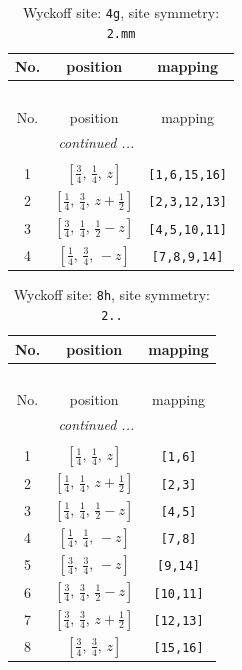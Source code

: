 \documentclass[fleqn,8pt]{jsarticle}
\begin{document}
\renewcommand{\arraystretch}{1.2}
\begin{longtable}{ccc}
\caption{Wyckoff site: {\tt 4g}, site symmetry: {\tt 2.mm}}
 \\
 \hline \hline
No. & position & mapping \\ \hline \endfirsthead

\multicolumn{2}{l}{\tablename\ \thetable{}} \\
 \hline \hline
No. & position & mapping \\ \hline \endhead

 \hline \hline
\multicolumn{2}{r}{\footnotesize\it continued ...} \\ \endfoot

 \hline \hline
\multicolumn{2}{r}{} \\ \endlastfoot

1 & $\left[ \frac{3}{4},\, \frac{1}{4},\, z \right]$ & {\tt [1,6,15,16]} \\ \hline
2 & $\left[ \frac{1}{4},\, \frac{3}{4},\, z + \frac{1}{2} \right]$ & {\tt [2,3,12,13]} \\ \hline
3 & $\left[ \frac{3}{4},\, \frac{1}{4},\, \frac{1}{2} - z \right]$ & {\tt [4,5,10,11]} \\ \hline
4 & $\left[ \frac{1}{4},\, \frac{3}{4},\, - z \right]$ & {\tt [7,8,9,14]} \\
\end{longtable}
\renewcommand{\arraystretch}{1.2}
\begin{longtable}{ccc}
\caption{Wyckoff site: {\tt 8h}, site symmetry: {\tt 2..}}
 \\
 \hline \hline
No. & position & mapping \\ \hline \endfirsthead

\multicolumn{2}{l}{\tablename\ \thetable{}} \\
 \hline \hline
No. & position & mapping \\ \hline \endhead

 \hline \hline
\multicolumn{2}{r}{\footnotesize\it continued ...} \\ \endfoot

 \hline \hline
\multicolumn{2}{r}{} \\ \endlastfoot

1 & $\left[ \frac{1}{4},\, \frac{1}{4},\, z \right]$ & {\tt [1,6]} \\ \hline
2 & $\left[ \frac{1}{4},\, \frac{1}{4},\, z + \frac{1}{2} \right]$ & {\tt [2,3]} \\ \hline
3 & $\left[ \frac{1}{4},\, \frac{1}{4},\, \frac{1}{2} - z \right]$ & {\tt [4,5]} \\ \hline
4 & $\left[ \frac{1}{4},\, \frac{1}{4},\, - z \right]$ & {\tt [7,8]} \\ \hline
5 & $\left[ \frac{3}{4},\, \frac{3}{4},\, - z \right]$ & {\tt [9,14]} \\ \hline
6 & $\left[ \frac{3}{4},\, \frac{3}{4},\, \frac{1}{2} - z \right]$ & {\tt [10,11]} \\ \hline
7 & $\left[ \frac{3}{4},\, \frac{3}{4},\, z + \frac{1}{2} \right]$ & {\tt [12,13]} \\ \hline
8 & $\left[ \frac{3}{4},\, \frac{3}{4},\, z \right]$ & {\tt [15,16]} \\
\end{longtable}
\end{document}
